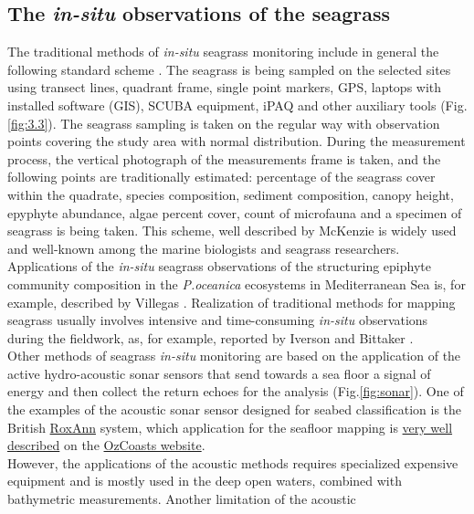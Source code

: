 \documentclass[11pt]{article}
\begin{document}
\subsection[\textit{In-situ} observations of the seagrass]{The \textit{in-situ} observations of the seagrass}
The traditional methods of \textit{in-situ} seagrass monitoring include in general the following standard
scheme \cite{McKenzieetal03}\label{McKenzieetal03}. The seagrass is being sampled on the selected sites using transect lines,
quadrant frame, single point markers, \ac{GPS}, laptops with installed software (\ac{GIS}), \ac{SCUBA} equipment, \ac{iPAQ} and other auxiliary tools\label{page-15} (Fig.\ref{fig:3.3}). The seagrass sampling is taken on the regular way with observation points covering the study area with normal distribution.
During the measurement process, the vertical photograph of the measurements frame is taken, and the
following points are traditionally estimated: percentage of the seagrass cover within the quadrate,
species composition, sediment composition, canopy height, epyphyte abundance, algae percent cover,
count of microfauna and a specimen of seagrass is being taken. This scheme, well described by
McKenzie \cite{McKenzieetal03}\label{McKenzieetal03} is widely used and well-known among the marine biologists and
seagrass researchers. Applications of the \textit{in-situ} seagrass observations of the structuring epiphyte
community composition in the \textit{P.oceanica} ecosystems in Mediterranean Sea is, for example,
described by Villegas \cite{Villegas06}\label{Villegas06}. Realization of traditional methods for mapping seagrass usually
involves intensive and time-consuming \textit{in-situ} observations during the fieldwork, as, for example,
reported by Iverson and Bittaker \cite{Iverson86}\label{Iverson86}. \\
Other methods of seagrass \textit{in-situ} monitoring are based on the application of the active hydro-acoustic sonar sensors that send towards a sea floor a signal of energy and then collect the return echoes for the analysis (Fig.\ref{fig:sonar}). One of the examples of the acoustic sonar sensor designed for seabed classification is the British \href{http://sonavision.co.uk/products.asp?cat_id=1}{RoxAnn} system, which application for the seafloor mapping is \href{http://www.ozcoasts.org.au/geom_geol/toolkit/Tech_CA_asc.jsp}{very well described} on the \href{http://www.ozcoasts.org.au/}{OzCoasts website}.\\ However, the applications of the acoustic methods requires specialized expensive equipment and is mostly used in the deep open waters, combined with bathymetric measurements. Another limitation of the acoustic
\end{document}
